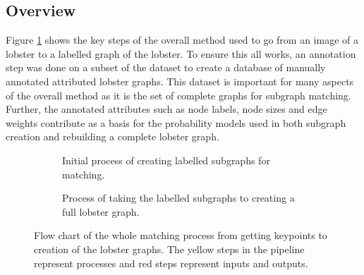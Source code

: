\subsection{Overview}
Figure \ref{fig:overview} shows the key steps of the overall method used to go from an image of a lobster to a labelled graph of the lobster. To ensure this all works, an annotation step was done on a subset of the dataset to create a database of manually annotated attributed lobster graphs. This dataset is important for many aspects of the overall method as it is the set of complete graphs for subgraph matching. Further, the annotated attributes such as node labels, node sizes and edge weights contribute as a basis for the probability models used in both subgraph creation and rebuilding a complete lobster graph.
\begin{figure}[H]
\centering
\begin{subfigure}{\textwidth}
\centering
{}
\caption{Initial process of creating labelled subgraphs for matching.}
\vspace{0.7cm}
\end{subfigure}

\begin{subfigure}{\textwidth}
\centering
{}
\caption{Process of taking the labelled subgraphs to creating a full lobster graph.}
\end{subfigure}
\caption{Flow chart of the whole matching process from getting keypoints to creation of the lobster graphs. The yellow steps in the pipeline represent processes and red steps represent inputs and outputs.}
\label{fig:overview}
\end{figure}
